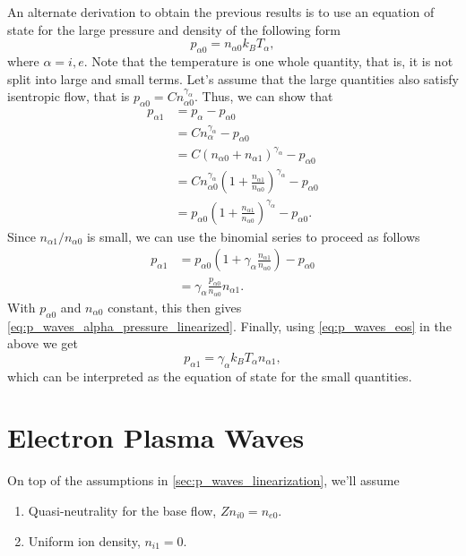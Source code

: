 \documentclass[a4paper,11pt]{report}
\begin{document}
An alternate derivation to obtain the previous results is to use an equation of state for the large pressure and density of the following form
\begin{equation}
    \label{eq:p_waves_eos}
    p_{\alpha 0} = n_{\alpha 0} k_B T_\alpha,
\end{equation}
where $\alpha = i,e$. Note that the temperature is one whole quantity, that is, it is not split into large and small terms. Let's assume that the large quantities also satisfy isentropic flow, that is $p_{\alpha 0} = C n^{\gamma_\alpha}_{\alpha 0}$. Thus, we can show that
\begin{align*}
    p_{\alpha 1} &= p_{\alpha} - p_{\alpha 0} \\
    &= C n_\alpha^{\gamma_\alpha} - p_{\alpha 0} \\
    &= C (n_{\alpha 0} + n_{\alpha 1})^{\gamma_\alpha} - p_{\alpha 0} \\
    &= C n_{\alpha 0}^{\gamma_\alpha} \left ( 1 + \frac{n_{\alpha 1}}{n_{\alpha 0}} \right )^{\gamma_\alpha} - p_{\alpha 0} \\
    &= p_{\alpha 0} \left ( 1 + \frac{n_{\alpha 1}}{n_{\alpha 0}} \right )^{\gamma_\alpha} - p_{\alpha 0}.
\end{align*} 
Since $n_{\alpha 1} / n_{\alpha 0}$ is small, we can use the binomial series to proceed as follows
\begin{align*}
    p_{\alpha 1} &= p_{\alpha 0} \left ( 1 + \gamma_\alpha \frac{n_{\alpha 1}}{n_{\alpha 0}} \right ) - p_{\alpha 0} \\
    &= \gamma_\alpha \frac{p_{\alpha 0}}{n_{\alpha 0}} n_{\alpha 1}.
\end{align*}
With $p_{\alpha 0}$ and $n_{\alpha 0}$ constant, this then gives \cref{eq:p_waves_alpha_pressure_linearized}. Finally, using \cref{eq:p_waves_eos} in the above we get
\begin{equation}
    p_{\alpha 1} = \gamma_\alpha k_B T_\alpha n_{\alpha 1},
\end{equation}
which can be interpreted as the equation of state for the small quantities.

\section{Electron Plasma Waves}
On top of the assumptions in \cref{sec:p_waves_linearization}, we'll assume 
\begin{enumerate}
    \item Quasi-neutrality for the base flow, $Zn_{i0} = n_{e0}$.
    \item Uniform ion density, $n_{i1} = 0$.
\end{enumerate}
\end{document}
